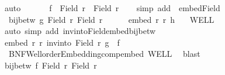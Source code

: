 \begin{isabellebody}
\ auto\isanewline
\ \ \isamarkupfalse%
\ \isamarkupfalse%
\ {\isasymsection}{\isacharcolon}{\kern0pt}\ {\isachardoublequoteopen}f{\isacharprime}{\kern0pt}\ {\isacharbackquote}{\kern0pt}\ Field\ r{\isacharprime}{\kern0pt}\ {\isasymsubseteq}\ Field\ r{\isacharprime}{\kern0pt}{\isacharprime}{\kern0pt}{\isachardoublequoteclose}\isanewline
\ \ \isamarkupfalse%
\ {\isacharparenleft}{\kern0pt}simp\ add{\isacharcolon}{\kern0pt}\ {\isachardoublequoteopen}{}{\isachardoublequoteclose}\ embed{\isacharunderscore}{\kern0pt}Field{\isacharparenright}{\kern0pt}\isanewline
\ \ \isacommand{{\isacharbraceleft}{\kern0pt}}\isamarkupfalse%
\isamarkupfalse%
\ {\isasymsection}{\isacharcolon}{\kern0pt}\ {\isachardoublequoteopen}bij{\isacharunderscore}{\kern0pt}betw\ {\isacharquery}{\kern0pt}g\ {\isacharparenleft}{\kern0pt}Field\ r{\isacharparenright}{\kern0pt}\ {\isacharparenleft}{\kern0pt}Field\ r{\isacharprime}{\kern0pt}{\isacharprime}{\kern0pt}{\isacharparenright}{\kern0pt}{\isachardoublequoteclose}\isanewline
\ \ \ \ \isamarkupfalse%
\ {\isachardoublequoteopen}embed\ r{\isacharprime}{\kern0pt}{\isacharprime}{\kern0pt}\ r\ {\isacharquery}{\kern0pt}h{\isachardoublequoteclose}\ \isamarkupfalse%
\ {}\ WELL\isanewline
\ \ \ \ \ \ \isamarkupfalse%
\ {\isacharparenleft}{\kern0pt}auto\ simp\ add{\isacharcolon}{\kern0pt}\ inv{\isacharunderscore}{\kern0pt}into{\isacharunderscore}{\kern0pt}Field{\isacharunderscore}{\kern0pt}embed{\isacharunderscore}{\kern0pt}bij{\isacharunderscore}{\kern0pt}betw{\isacharparenright}{\kern0pt}\isanewline
\ \ \ \ \isamarkupfalse%
\ {\isachardoublequoteopen}embed\ r{\isacharprime}{\kern0pt}\ r\ {\isacharparenleft}{\kern0pt}inv{\isacharunderscore}{\kern0pt}into\ {\isacharparenleft}{\kern0pt}Field\ r{\isacharparenright}{\kern0pt}\ {\isacharquery}{\kern0pt}g\ {\isasymcirc}\ f{\isacharprime}{\kern0pt}{\isacharparenright}{\kern0pt}{\isachardoublequoteclose}\isanewline
\ \ \ \ \ \ \isamarkupfalse%
\ {\isachardoublequoteopen}{}{\isachardoublequoteclose}\ BNF{\isacharunderscore}{\kern0pt}Wellorder{\isacharunderscore}{\kern0pt}Embedding{\isachardot}{\kern0pt}comp{\isacharunderscore}{\kern0pt}embed\ WELL{\isacharprime}{\kern0pt}\ \isamarkupfalse%
\ blast\isanewline
\ \ \ \ \isamarkupfalse%
\ \isamarkupfalse%
\ {\isachardoublequoteopen}bij{\isacharunderscore}{\kern0pt}betw\ f{\isacharprime}{\kern0pt}\ {\isacharparenleft}{\kern0pt}Field\ r{\isacharprime}{\kern0pt}{\isacharparenright}{\kern0pt}\ {\isacharparenleft}{\kern0pt}Field\ r{\isacharprime}{\kern0pt}{\isacharprime}{\kern0pt}{\isacharparenright}{\kern0pt}{\isachardoublequoteclose}\isanewline

\end{isabellebody}

